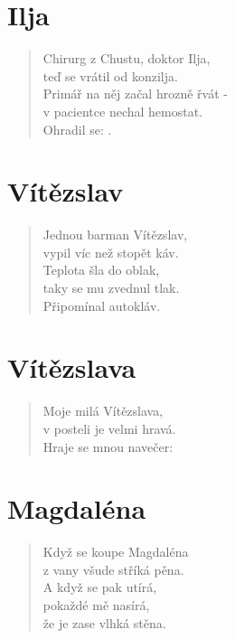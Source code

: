\section*{Ilja}
\begin{verse}
Chirurg z Chustu, doktor Ilja,\\
teď se vrátil od konzilja.\\
Primář na něj začal hrozně řvát -\\
v pacientce nechal hemostat.\\
Ohradil se: .
\end{verse}    

\section*{Vítězslav}
\begin{verse}
Jednou barman Vítězslav,\\
vypil víc než stopět káv.\\
Teplota šla do oblak,\\
taky se mu zvednul tlak.\\
Připomínal autokláv.
\end{verse}    

\section*{Vítězslava}
\begin{verse}
Moje milá Vítězslava,\\
v posteli je velmi hravá.\\
Hraje se mnou navečer:\\
\end{verse}    

\section*{Magdaléna}
\begin{verse}
Když se koupe Magdaléna\\
z vany všude stříká pěna.\\
A když se pak utírá,\\
pokaždé mě nasírá,\\
že je zase vlhká stěna.
\end{verse}    

